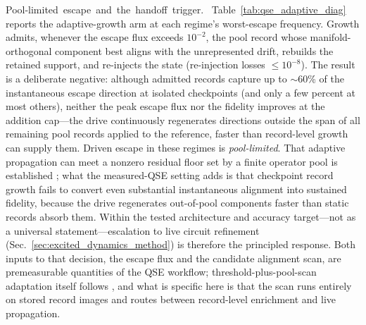 \documentclass[
  reprint,
  amsmath,
  amssymb,
  aps,
  pra,
  nofootinbib,
  superscriptaddress,
  floatfix
]{revtex4-2}
\newcommand{\tentative}[1]{\textcolor{red!70!black}{#1}}
\newcommand{\structlabel}[1]{\noindent\mbox{\tentative{#1.}}~}
\begin{document}
\structlabel{Pool-limited escape and the handoff trigger}
Table~\ref{tab:qse_adaptive_diag} reports the adaptive-growth arm at each regime's worst-escape frequency.  Growth admits, whenever the escape flux exceeds $10^{-2}$, the pool record whose manifold-orthogonal component best aligns with the unrepresented drift, rebuilds the retained support, and re-injects the state (re-injection losses $\le10^{-8}$).  The result is a deliberate negative: although admitted records capture up to $\sim$60\% of the instantaneous escape direction at isolated checkpoints (and only a few percent at most others), neither the peak escape flux nor the fidelity improves at the addition cap---the drive continuously regenerates directions outside the span of all remaining pool records applied to the reference, faster than record-level growth can supply them.  Driven escape in these regimes is \emph{pool-limited}.  That adaptive propagation can meet a nonzero residual floor set by a finite operator pool is established \cite{Gomes2023AVQDSGreen}; what the measured-QSE setting adds is that checkpoint record growth fails to convert even substantial instantaneous alignment into sustained fidelity, because the drive regenerates out-of-pool components faster than static records absorb them.  Within the tested architecture and accuracy target---not as a universal statement---escalation to live circuit refinement (Sec.~\ref{sec:excited_dynamics_method}) is therefore the principled response.  Both inputs to that decision, the escape flux and the candidate alignment scan, are premeasurable quantities of the QSE workflow; threshold-plus-pool-scan adaptation itself follows \cite{Yao2021AVQDS}, and what is specific here is that the scan runs entirely on stored record images and routes between record-level enrichment and live propagation.




\end{document}
